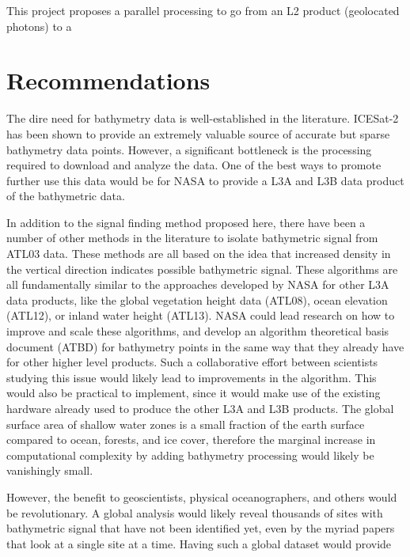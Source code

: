 This project proposes a parallel processing to go from an L2 product (geolocated photons) to a 

\section{Recommendations}

The dire need for bathymetry data is well-established in the literature. ICESat-2 has been shown to provide an extremely valuable source of accurate but sparse bathymetry data points. However, a significant bottleneck is the processing required to download and analyze the data. One of the best ways to promote further use this data would be for NASA to provide a L3A and L3B data product of the bathymetric data. 

In addition to the signal finding method proposed here, there have been a number of other methods in the literature to isolate bathymetric signal from ATL03 data. These methods are all based on the idea that increased density in the vertical direction indicates possible bathymetric signal. These algorithms are all fundamentally similar to the approaches developed by NASA for other L3A data products, like the global vegetation height data (ATL08), ocean elevation (ATL12), or inland water height (ATL13). NASA could lead research on how to improve and scale these algorithms, and develop an algorithm theoretical basis document (ATBD) for bathymetry points in the same way that they already have for other higher level products. Such a collaborative effort between scientists studying this issue would likely lead to improvements in the algorithm. This would also be practical to implement, since it would make use of the existing hardware already used to produce the other L3A and L3B products. The global surface area of shallow water zones is a small fraction of the earth surface compared to ocean, forests, and ice cover, therefore the marginal increase in computational complexity by adding bathymetry processing would likely be vanishingly small. 

However, the benefit to geoscientists, physical oceanographers, and others would be revolutionary. A global analysis would likely reveal thousands of sites with bathymetric signal that have not been identified yet, even by the myriad papers that look at a single site at a time. Having such a global dataset would provide 